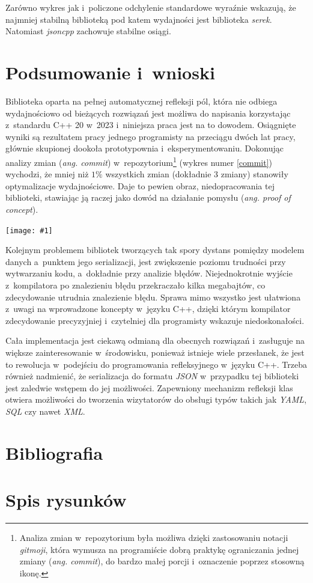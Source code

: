 \documentclass[12pt]{article}
\newcommand{\n}{\newline}
\newcommand{\putfig}[3]{
\begin{captioned}[H]
	\centering
	\texttt{[image: \#1]}
	\caption{#2}
	\label{#3}
	\medskip
\end{captioned}
}
\newcommand{\nonpl}[1]{{\it #1}}
\newcommand{\ang}[1]{\nonpl{ang. #1}}
\newcommand{\JSON}{\nonpl{JSON} }
\newcommand{\serek}{\nonpl{serek}}
\begin{document}
{{{				Zarówno wykres jak i~policzone odchylenie standardowe wyraźnie wskazują, że najmniej stabilną biblioteką pod katem wydajności jest biblioteka \serek.
				Natomiast \nonpl{jsoncpp} zachowuje stabilne osiągi.
			}
		}

		{
			\section{Podsumowanie i~wnioski}

			Biblioteka oparta na pełnej automatycznej refleksji pól, która nie odbiega wydajnościowo od bieżących rozwiązań jest możliwa do napisania korzystając
			z~standardu C++ 20 w~2023 i~niniejsza praca jest na to dowodem. Osiągnięte wyniki są rezultatem pracy jednego programisty na przeciągu dwóch lat
			pracy, głównie skupionej dookoła prototypownia i~eksperymentowaniu. Dokonując analizy zmian (\ang{commit}) w~repozytorium\footnote{
				Analiza zmian w~repozytorium była możliwa dzięki zastosowaniu notacji \nonpl{gitmoji}\cite{gitmoji}, która wymusza na programiście dobrą praktykę
				ograniczania jednej zmiany (\ang{commit}), do bardzo małej porcji i~oznaczenie poprzez stosowną ikonę.
			} (wykres numer \ref{commit}) wychodzi, że mniej niż $1\%$ wszystkich zmian (dokładnie $3$ zmiany) stanowiły optymalizacje wydajnościowe. Daje to pewien obraz,
			niedopracowania tej biblioteki, stawiając ją raczej jako dowód na działanie pomysłu (\ang{proof of concept}).\n

			\putfig{./charts/pre_generated_charts/commit_percentage.png}{Udział rodzajów zmian w~całym repozytorium \serek}{commit}

			\newpage

			Kolejnym problemem bibliotek tworzących tak spory dystans pomiędzy modelem danych a~punktem jego serializacji, jest zwiększenie poziomu trudności
			przy wytwarzaniu kodu, a~dokładnie przy analizie błędów. Niejednokrotnie wyjście z~kompilatora po znalezieniu błędu przekraczało kilka megabajtów,
			co zdecydowanie utrudnia znalezienie błędu. Sprawa mimo wszystko jest ułatwiona z~uwagi na wprowadzone koncepty w~języku C++, dzięki którym kompilator
			zdecydowanie precyzyjniej i~czytelniej dla programisty wskazuje niedoskonałości.\n

			Cała implementacja jest ciekawą odmianą dla obecnych rozwiązań i~zasługuje na większe zainteresowanie w~środowisku, ponieważ istnieje wiele przesłanek, że
			jest to rewolucja w~podejściu do programowania refleksyjnego w~języku C++. Trzeba również nadmienić, że serializacja do formatu \JSON w~przypadku tej biblioteki
			jest zaledwie wstępem do jej możliwości. Zapewniony mechanizm refleksji klas otwiera możliwości do tworzenia wizytatorów do obsługi typów takich jak \nonpl{YAML}, \nonpl{SQL}
			czy nawet \nonpl{XML}.
		}
	}

	{
		\section{Bibliografia}
		\printbibliography[heading=none]
	}

	{

		\section{Spis rysunków}
		\listofcaptioneds
		\thispagestyle{fancy}
	}
\end{document}
